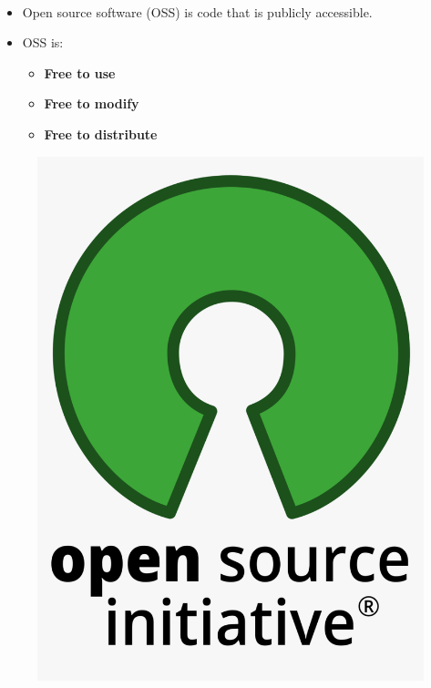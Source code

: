 \setlength{\columnsep}{5pt}
\begin{flushleft}
	\paragraph{}
	\begin{itemize}
		\item Open source software (OSS) is code that is publicly accessible.
		\item OSS is:
		\begin{itemize}
			\item \textbf{Free to use}
			\item \textbf{Free to modify}
			\item \textbf{Free to distribute}
		\end{itemize}
	\end{itemize}	
	\bigskip
	\bigskip
	\bigskip
	\begin{figure}[h!]
		\centering
		\includegraphics[scale=.1]{content/chapter1/images/open.png}

\end{figure}
\end{flushleft}
